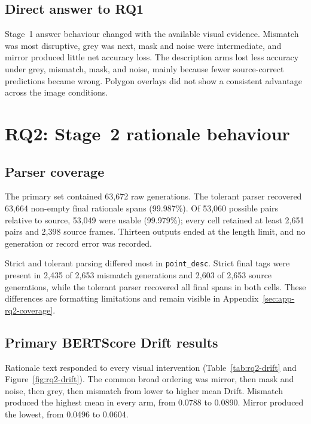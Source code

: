 \subsection{Direct answer to RQ1}
\label{sec:results-rq1-answer}

\begin{samepage}
Stage~1 answer behaviour changed with the available visual evidence. Mismatch
was most disruptive, grey was next, mask and noise were intermediate, and mirror
produced little net accuracy loss. The description arms lost less accuracy under
grey, mismatch, mask, and noise, mainly because fewer source-correct predictions
became wrong. Polygon overlays did not show a consistent advantage across the
image conditions.
\end{samepage}

\section{RQ2: Stage~2 rationale behaviour}
\label{sec:results-rq2}

\subsection{Parser coverage}
\label{sec:results-rq2-coverage}

The primary set contained 63,672 raw generations. The tolerant parser
recovered 63,664 non-empty final rationale spans (99.987\%). Of 53,060 possible
pairs relative to source, 53,049 were usable (99.979\%); every cell retained at
least 2,651 pairs and 2,398 source frames. Thirteen outputs ended at the length
limit, and no generation or record error was recorded.

Strict and tolerant parsing differed most in \texttt{point\_desc}. Strict
final tags were present in 2,435 of 2,653 mismatch generations and 2,603 of
2,653 source generations, while the tolerant parser recovered all final spans in
both cells. These differences are formatting limitations and remain visible in
Appendix~\ref{sec:app-rq2-coverage}.

\subsection{Primary BERTScore Drift results}
\label{sec:results-rq2-drift}

Rationale text responded to every visual intervention
(Table~\ref{tab:rq2-drift} and Figure~\ref{fig:rq2-drift}). The common broad
ordering was mirror, then mask and noise, then grey, then mismatch from lower to
higher mean Drift. Mismatch
produced the highest mean in every arm, from 0.0788 to 0.0890. Mirror produced
the lowest, from 0.0496 to 0.0604.


